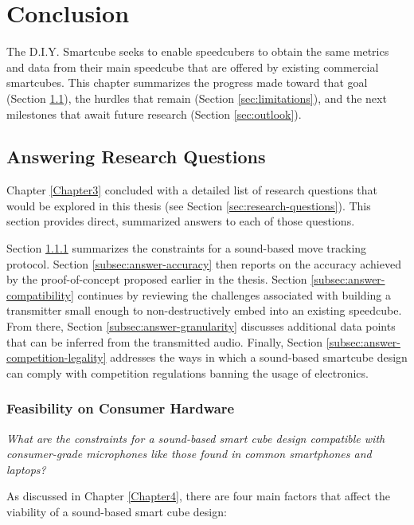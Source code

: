 \chapter{Conclusion} 
\label{Chapter8}

The D.I.Y. Smartcube seeks to enable speedcubers to obtain the same
metrics and data from their main speedcube that are offered by existing
commercial smartcubes. This chapter summarizes the progress made toward
that goal (Section \ref{sec:answering-research-questions}), the hurdles
that remain (Section \ref{sec:limitations}), and the next milestones
that await future research (Section \ref{sec:outlook}).


\section{Answering Research Questions}
\label{sec:answering-research-questions}

Chapter \ref{Chapter3} concluded with a detailed list of research
questions that would be explored in this thesis (see Section
\ref{sec:research-questions}). This section provides direct, summarized
answers to each of those questions.

Section \ref{subsec:answer-feasibility} summarizes the constraints for
a sound-based move tracking protocol. Section
\ref{subsec:answer-accuracy} then reports on the accuracy achieved by
the proof-of-concept proposed earlier in the thesis. Section
\ref{subsec:answer-compatibility} continues by reviewing the challenges
associated with building a transmitter small enough to
non-destructively embed into an existing speedcube. From there, Section
\ref{subsec:answer-granularity} discusses additional data points that
can be inferred from the transmitted audio. Finally, Section
\ref{subsec:answer-competition-legality} addresses the ways in which a
sound-based smartcube design can comply with competition regulations
banning the usage of electronics.

\subsection{Feasibility on Consumer Hardware}
\label{subsec:answer-feasibility}

\emph{What are the constraints for a sound-based smart cube design
compatible with consumer-grade microphones like those found in common
smartphones and laptops?}

As discussed in Chapter \ref{Chapter4}, there are four main factors
that affect the viability of a sound-based smart cube design: 

